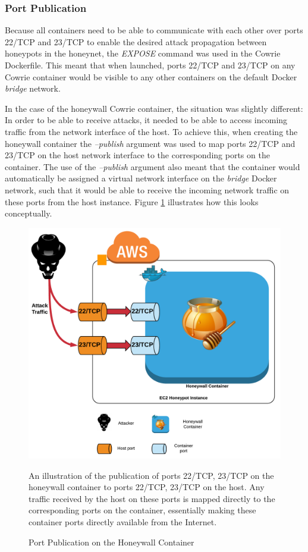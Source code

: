 \subsubsection{Port Publication}
Because all containers need to be able to communicate with each other over ports 22/TCP and 23/TCP to enable the desired attack propagation between honeypots in the honeynet, the \textit{EXPOSE} command was used in the Cowrie Dockerfile. This meant that when launched, ports 22/TCP and 23/TCP on any Cowrie container would be visible to any other containers on the default Docker \textit{bridge} network.

In the case of the honeywall Cowrie container, the situation was slightly different: In order to be able to receive attacks, it needed to be able to access incoming traffic from the network interface of the host. To achieve this, when creating the honeywall container the \textit{--publish} argument was used to map ports 22/TCP and 23/TCP on the host network interface to the corresponding ports on the container. The use of the \textit{--publish} argument also meant that the container would automatically be assigned a virtual network interface on the \textit{bridge} Docker network, such that it would be able to receive the incoming network traffic on these ports from the host instance. Figure \ref{fig:HoneywallPortPublication} illustrates how this looks conceptually.

 \begin{figure}[ht]
      \centering
      \includegraphics[width=125mm, scale=1]{Images/Port_mapping_for_the_honeywall_container.png}
      \caption{Port Publication on the Honeywall Container} 
      \medskip
      \small
		An illustration of the publication of ports 22/TCP, 23/TCP on the honeywall container to ports 22/TCP, 23/TCP on the host. Any traffic received by the host on these ports is mapped directly to the corresponding ports on the container, essentially making these container ports directly available from the Internet.
\label{fig:HoneywallPortPublication}
\end{figure}

